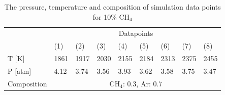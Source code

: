 \begin{table}[]
	\caption{The pressure, temperature and composition of simulation data points for 10\% $\mathrm{CH_4}$}
	\centering
	\begin{tabular}{l|llllllll|}
		\cline{2-9}
     	& \multicolumn{8}{c|}{Datapoints}                       \\ \cline{2-9} 
		& (1)  & (2)  & (3)  & (4)  & (5)  & (6)  & (7)  & (8)  \\ \hline
		\multicolumn{1}{|l|}{T {[}K{]}}   & 1861 & 1917 & 2030 & 2155 & 2184 & 2313 & 2375 & 2455 \\ \hline
		\multicolumn{1}{|l|}{P {[}atm{]}} & 4.12 & 3.74 & 3.56 & 3.93 & 3.62 & 3.58 & 3.75 & 3.47 \\ \hline
		\multicolumn{1}{|l|}{Composition} & \multicolumn{8}{c|}{$\mathrm{CH_4}$: 0.3, Ar: 0.7}               \\ \hline
	\end{tabular}
	\label{tab:shocktubest_CH4_30} 
\end{table}

